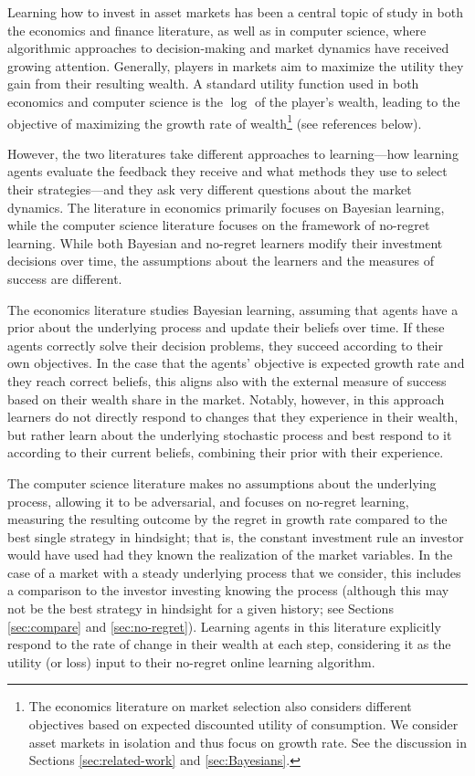 Learning how to invest in asset markets has been a central topic of study in both the economics and finance literature, as well as in computer science, where algorithmic approaches to decision-making and market dynamics have received growing attention. Generally, players in markets aim to maximize the utility they gain from their resulting wealth. A standard utility function used in both economics and computer science is the $\log$ of the player's wealth, leading to the objective of maximizing the growth rate of wealth\footnote{The economics literature on market selection also considers different objectives based on expected discounted utility of consumption. We consider asset markets in isolation and thus focus on growth rate. 
See the discussion in Sections \ref{sec:related-work} and \ref{sec:Bayesians}.} (see references below).

However, the two literatures take different approaches to learning---how learning agents  evaluate the feedback they receive and what methods they use to select their strategies---and they ask very different questions about the market dynamics. The literature in economics primarily focuses on Bayesian learning, while the computer science literature focuses on the framework of no-regret learning. While both Bayesian and no-regret learners modify their investment decisions over time, the assumptions about the learners and the measures of success are different. 

The economics literature studies Bayesian learning, assuming that agents have a prior about the underlying process and update their beliefs over time.  
If these agents correctly solve their decision problems, they succeed according to their own objectives. In the case that the agents' objective is expected growth rate and they reach correct beliefs, this aligns also with the external measure of success based on their wealth share in the market. 
Notably, however, in this approach learners do not directly respond to changes that they experience in their wealth, but rather learn about the underlying stochastic process and best respond to it according to their current beliefs, combining their prior with their experience.

The computer science literature makes no assumptions about the underlying process, allowing it to be adversarial, and focuses on no-regret learning, measuring the resulting outcome by the regret in growth rate compared to the best single strategy in hindsight; that is, the constant investment rule an investor would have used had they known the realization of the market variables. In the case of a market with a steady underlying process that we consider, this includes a comparison to the investor investing knowing the process (although this may not be the best strategy in hindsight for a given history; see Sections \ref{sec:compare} and \ref{sec:no-regret}).
Learning agents in this literature explicitly respond to the rate of change in their wealth at each step, considering it as the utility (or loss) input to their no-regret online learning algorithm. 

